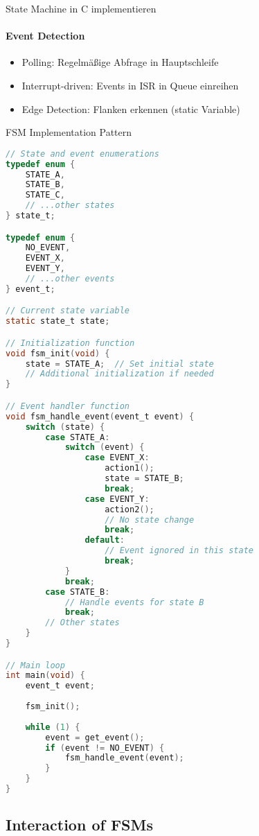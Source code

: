 \begin{KR}{State Machine in C implementieren}
\paragraph{Event Detection}
    \begin{itemize}
        \item Polling: Regelmäßige Abfrage in Hauptschleife
        \item Interrupt-driven: Events in ISR in Queue einreihen
        \item Edge Detection: Flanken erkennen (static Variable)
    \end{itemize}
\end{KR}

\begin{code}{FSM Implementation Pattern}
\begin{lstlisting}[language=C, style=basesmol]
// State and event enumerations
typedef enum {
    STATE_A,
    STATE_B,
    STATE_C,
    // ...other states
} state_t;

typedef enum {
    NO_EVENT,
    EVENT_X,
    EVENT_Y,
    // ...other events
} event_t;

// Current state variable
static state_t state;

// Initialization function
void fsm_init(void) {
    state = STATE_A;  // Set initial state
    // Additional initialization if needed
}

// Event handler function
void fsm_handle_event(event_t event) {
    switch (state) {
        case STATE_A:
            switch (event) {
                case EVENT_X:
                    action1();
                    state = STATE_B;
                    break;
                case EVENT_Y:
                    action2();
                    // No state change
                    break;
                default:
                    // Event ignored in this state
                    break;
            }
            break;
        case STATE_B:
            // Handle events for state B
            break;
        // Other states
    }
}

// Main loop
int main(void) {
    event_t event;
    
    fsm_init();
    
    while (1) {
        event = get_event();
        if (event != NO_EVENT) {
            fsm_handle_event(event);
        }
    }
}
\end{lstlisting}
\end{code}



\subsection{Interaction of FSMs}

